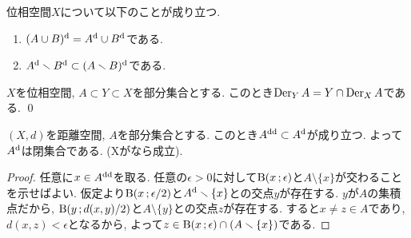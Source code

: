\documentclass[uplatex, dvipdfmx, a4paper, 12pt, class=jsbook, crop=false]{standalone}
\begin{document}
\begin{proposition}
	位相空間$ X $について以下のことが成り立つ.
	\begin{enumerate}
		\item $ (A \cup B)^{\mathrm{d}} = A^{\mathrm{d}} \cup B^{\mathrm{d}} $である.
		\item $ A^{\mathrm{d}} \smallsetminus B^{\mathrm{d}} \subset (A \smallsetminus B)^{\mathrm{d}} $である.
	\end{enumerate}
\end{proposition}

\begin{proposition}
	$ X $を位相空間, $ A \subset Y \subset X $を部分集合とする.
	このとき$ \mathop{\mathrm{Der}}\nolimits_Y A = Y \cap \mathop{\mathrm{Der}}\nolimits_X A $である. \qed
\end{proposition}

\begin{proposition}
	$ (X, d) $を距離空間, $ A $を部分集合とする.
	このとき$ A^{\mathrm{d}\mathrm{d}} \subset A^{\mathrm{d}} $が成り立つ.
	よって$ A^{\mathrm{d}} $は閉集合である. (Xがなら成立).
\end{proposition}

\begin{proof}
	任意に$ x \in A^{\mathrm{d}\mathrm{d}} $を取る.
	任意の$ \epsilon > 0 $に対して$ \topball{x}{\epsilon} $と$ A \setminus \{x\} $が交わることを示せばよい.
	仮定より$ \topball{x}{\epsilon/2} $と$ A^{\mathrm{d}} \smallsetminus \{x\} $との交点$ y $が存在する.
	$ y $が$ A $の集積点だから, $ \topball{y}{d(x, y)/2} $と$ A \setminus \{y\} $との交点$ z $が存在する.
	すると$ x \neq z \in A $であり, $ d(x, z) < \epsilon $となるから, よって$ z \in \topball{x}{\epsilon} \cap \left( A \setminus \{x\} \right) $である.
\end{proof}
\end{document}
